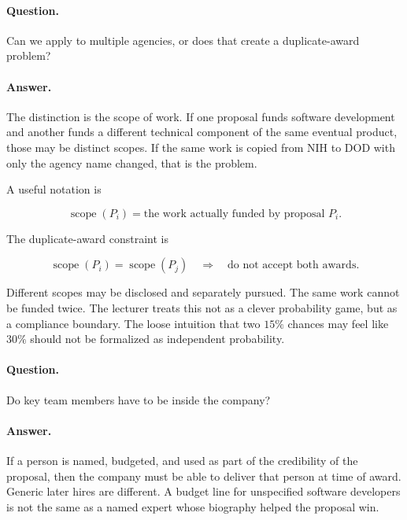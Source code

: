 \paragraph{Question.}
Can we apply to multiple agencies, or does that create a duplicate-award problem?

\paragraph{Answer.}
The distinction is the scope of work. If one proposal funds software development and another funds a different technical component of the same eventual product, those may be distinct scopes. If the same work is copied from NIH to DOD with only the agency name changed, that is the problem.

A useful notation is

\begin{equation}
\operatorname{scope}(P_i)=\text{the work actually funded by proposal }P_i.
\end{equation}

The duplicate-award constraint is

\begin{equation}
\operatorname{scope}(P_i)=\operatorname{scope}(P_j)
\quad\Longrightarrow\quad
\text{do not accept both awards.}
\end{equation}

Different scopes may be disclosed and separately pursued. The same work cannot be funded twice. The lecturer treats this not as a clever probability game, but as a compliance boundary. The loose intuition that two \(15\%\) chances may feel like \(30\%\) should not be formalized as independent probability.

\paragraph{Question.}
Do key team members have to be inside the company?

\paragraph{Answer.}
If a person is named, budgeted, and used as part of the credibility of the proposal, then the company must be able to deliver that person at time of award. Generic later hires are different. A budget line for unspecified software developers is not the same as a named expert whose biography helped the proposal win.

